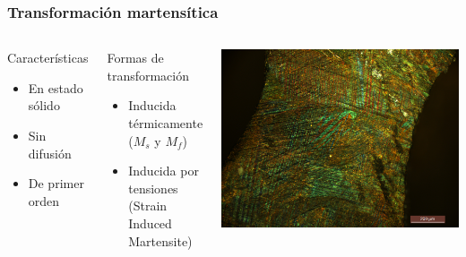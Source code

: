 \documentclass[usenames,dvipsnames]{beamer}
\begin{document}
 \begin{frame}
 \frametitle{Transformación martensítica}

\begin{columns}
 

\begin{block}{Características}
 \begin{itemize}
  \item En estado sólido
  \item Sin difusión
  \item De primer orden
 \end{itemize}
\end{block}
 
\begin{block}{Formas de transformación}
  \begin{itemize}
  \item \alert<1>{Inducida térmicamente ($M_s$ y $M_f$)}
  \item Inducida por tensiones (Strain Induced Martensite)
 \end{itemize}
\end{block}


\includegraphics[width=\columnwidth]{img/intro/EspAMicro1.jpg}

\end{columns}
 
\end{frame}
\end{document}
